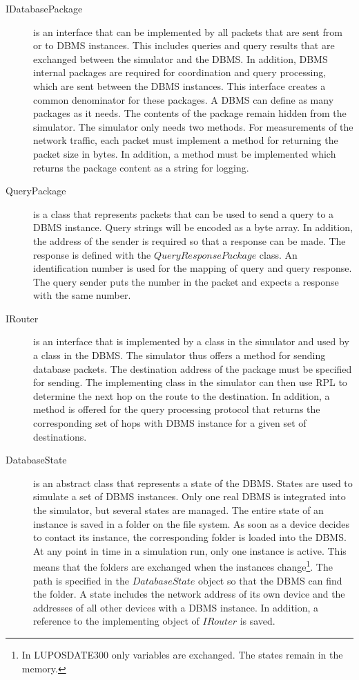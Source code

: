 \documentclass[english,version-2019-11]{uzl-thesis}
\begin{document}
\begin{description}
 \item [IDatabasePackage]
 is an interface that can be implemented by all packets that are sent from or to DBMS instances. This includes queries and query results that are exchanged between the simulator and the DBMS. In addition, DBMS internal packages are required for coordination and query processing, which are sent between the DBMS instances. This interface creates a common denominator for these packages. A DBMS can define as many packages as it needs. The contents of the package remain hidden from the simulator. The simulator only needs two methods. For measurements of the network traffic, each packet must implement a method for returning the packet size in bytes. In addition, a method must be implemented which returns the package content as a string for logging.
 \item [QueryPackage]
 is a class that represents packets that can be used to send a query to a DBMS instance. Query strings will be encoded as a byte array. In addition, the address of the sender is required so that a response can be made. The response is defined with the $QueryResponsePackage$ class. An identification number is used for the mapping of query and query response. The query sender puts the number in the packet and expects a response with the same number.
\item [IRouter]
is an interface that is implemented by a class in the simulator and used by a class in the DBMS. The simulator thus offers a method for sending database packets. The destination address of the package must be specified for sending. The implementing class in the simulator can then use RPL to determine the next hop on the route to the destination. In addition, a method is offered for the query processing protocol that returns the corresponding set of hops with DBMS instance for a given set of destinations.
\item [DatabaseState]
is an abstract class that represents a state of the DBMS. States are used to simulate a set of DBMS instances. Only one real DBMS is integrated into the simulator, but several states are managed. The entire state of an instance is saved in a folder on the file system. As soon as a device decides to contact its instance, the corresponding folder is loaded into the DBMS. At any point in time in a simulation run, only one instance is active. This means that the folders are exchanged when the instances change\footnote{In LUPOSDATE300 only variables are exchanged. The states remain in the memory.}. The path is specified in the $DatabaseState$ object so that the DBMS can find the folder. A state includes the network address of its own device and the addresses of all other devices with a DBMS instance. In addition, a reference to the implementing object of $IRouter$ is saved.

\end{description}
\end{document}

